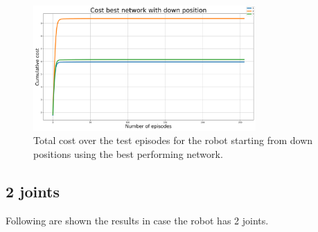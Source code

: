 \documentclass[twocolumn, a4paper]{article}
\begin{document}
\vspace{-1cm}
\label{fig:Test_1_best_down_pos}
\begin{figure}[H]
	\centering
	\includegraphics[width=8.5cm]{"../Figures/loss_best_net_down_positions_1J_500E_256EL.png"}
	\caption{Total cost over the test episodes for the robot starting from
			 down positions using the best performing network.}
\end{figure}

\subsection{2 joints}
Following are shown the results in case the robot has 2 joints.
\end{document}

